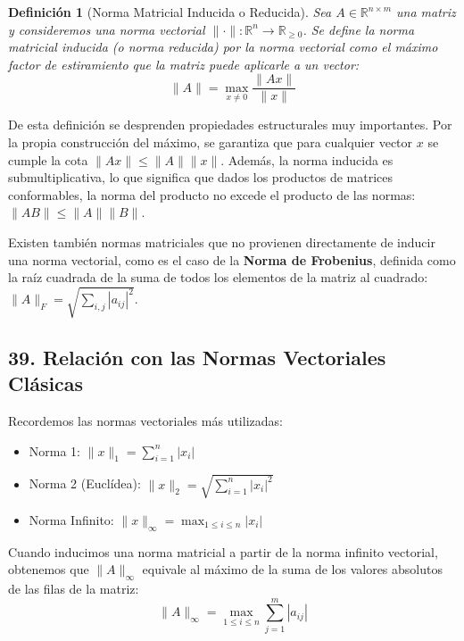 \documentclass[12pt]{article}
\newtheorem{definicion}{Definición}
\begin{document}
\begin{definicion}[Norma Matricial Inducida o Reducida]
Sea $A \in \mathbb{R}^{n \times m}$ una matriz y consideremos una norma vectorial $\|\cdot\| : \mathbb{R}^n \to \mathbb{R}_{\ge 0}$. Se define la \textit{norma matricial inducida} (o norma reducida) por la norma vectorial como el máximo factor de estiramiento que la matriz puede aplicarle a un vector:
\begin{equation}
    \|A\| = \max_{x \ne 0} \frac{\|Ax\|}{\|x\|}
\end{equation}
\end{definicion}

De esta definición se desprenden propiedades estructurales muy importantes. Por la propia construcción del máximo, se garantiza que para cualquier vector $x$ se cumple la cota $\|Ax\| \le \|A\| \|x\|$. Además, la norma inducida es submultiplicativa, lo que significa que dados los productos de matrices conformables, la norma del producto no excede el producto de las normas: $\|AB\| \le \|A\| \|B\|$.

Existen también normas matriciales que no provienen directamente de inducir una norma vectorial, como es el caso de la \textbf{Norma de Frobenius}, definida como la raíz cuadrada de la suma de todos los elementos de la matriz al cuadrado: $\|A\|_F = \sqrt{\sum_{i,j} |a_{ij}|^2}$.



\subsection*{39. Relación con las Normas Vectoriales Clásicas}
Recordemos las normas vectoriales más utilizadas:
\begin{itemize}
    \item Norma 1: $\|x\|_1 = \sum_{i=1}^n |x_i|$
    \item Norma 2 (Euclídea): $\|x\|_2 = \sqrt{\sum_{i=1}^n |x_i|^2}$
    \item Norma Infinito: $\|x\|_\infty = \max_{1 \le i \le n} |x_i|$
\end{itemize}

Cuando inducimos una norma matricial a partir de la norma infinito vectorial, obtenemos que $\|A\|_\infty$ equivale al máximo de la suma de los valores absolutos de las filas de la matriz:
\begin{equation}
    \|A\|_\infty = \max_{1 \le i \le n} \sum_{j=1}^m |a_{ij}|
\end{equation}
\end{document}
